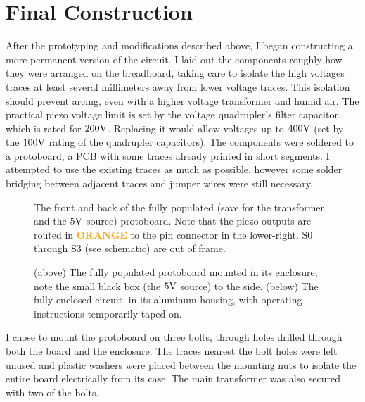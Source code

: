 \documentclass[12pt]{article}
\begin{document}
\section{Final Construction}
\par After the prototyping and modifications described above, I began constructing a more permanent version of the circuit.
I laid out the components roughly how they were arranged on the breadboard, taking care to isolate the high voltages traces at least several millimeters away from lower voltage traces. This isolation should prevent arcing, even with a higher voltage transformer and humid air. The practical piezo voltage limit is set by the voltage quadrupler's filter capacitor, which is rated for $200\volt$. Replacing it would allow voltages up to $400\volt$ (set by the $100\volt$ rating of the quadrupler capacitors).
The components were soldered to a protoboard, a PCB with some traces already printed in short segments. I attempted to use the existing traces as much as possible, however some solder bridging between adjacent traces and jumper wires were still necessary.
\begin{figure}[ht]
\centering
\caption{The front and back of the fully populated (save for the transformer and the $5\volt$ source) protoboard. Note that the piezo outputs are routed in \textcolor{orange}{\textbf{ORANGE}} to the pin connector in the lower-right. $\textrm{S0}$ through $\textrm{S3}$ (see schematic) are out of frame.}
\label{fig:boardpic}
\end{figure}
\begin{figure}[ht]
\centering
\caption{(above) The fully populated protoboard mounted in its enclosure, note the small black box (the $5\volt$ source) to the side. (below) The fully enclosed circuit, in its aluminum housing, with operating instructions temporarily taped on.}
\label{fig:encpic}
\end{figure}
\par I chose to mount the protoboard on three bolts, through holes drilled through both the board and the enclosure.
The traces nearest the bolt holes were left unused and plastic washers were placed between the mounting nuts to isolate the entire board electrically from its case.
The main transformer was also secured with two of the bolts.
\end{document}
